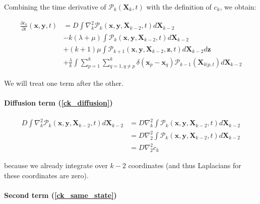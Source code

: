 Combining the time derivative of $\mathcal{P}_{k}(\boldsymbol{X}_{k},t)$ with
the definition of $c_{k}$, we obtain:

\begin{subequations} 
\begin{align}
\frac{\partial c_{k}}{\partial t}(\boldsymbol{x},\boldsymbol{y},t) & =D\int\nabla_{k}^{2}\mathcal{P}_{k}(\boldsymbol{x},\boldsymbol{y},\boldsymbol{X}_{k-2},t)d\boldsymbol{X}_{k-2}\label{ck_diffusion}\\
 & -k(\lambda+\mu)\int\mathcal{P}_{k}(\boldsymbol{x},\boldsymbol{y},\boldsymbol{X}_{k-2},t)d\boldsymbol{X}_{k-2}\label{ck_same_state}\\
 & +(k+1)\mu\int\mathcal{P}_{k+1}(\boldsymbol{x},\boldsymbol{y},\boldsymbol{X}_{k-2},\boldsymbol{z},t)d\boldsymbol{X}_{k-2}d\boldsymbol{z}\label{ck_death}\\
 & +\frac{\lambda}{k}\int\sum_{p=1}^{k}\sum_{q=1,q\neq p}^{k}\delta({\boldsymbol{x}_p-\boldsymbol{x}_q})\mathcal{P}_{k-1}(\boldsymbol{X}_{k|p,t})d\boldsymbol{X}_{k-2}\label{ck_birth}
\end{align}
\end{subequations}

We will treat one term after the other. \\


\paragraph*{Diffusion term (\ref{ck_diffusion})}

\begin{subequations} 
\begin{align}
D\int\nabla_{k}^{2}\mathcal{P}_{k}(\boldsymbol{x},\boldsymbol{y},\boldsymbol{X}_{k-2},t)d\boldsymbol{X}_{k-2} & =D\nabla_{k}^{2}\int\mathcal{P}_{k}(\boldsymbol{x},\boldsymbol{y},\boldsymbol{X}_{k-2},t)d\boldsymbol{X}_{k-2}\\
 & =D\nabla_{2}^{2}\int\mathcal{P}_{k}(\boldsymbol{x},\boldsymbol{y},\boldsymbol{X}_{k-2},t)d\boldsymbol{X}_{k-2}\\
 & =D\nabla_{2}^{2}c_{k}\label{diffusion_term_deriv}
\end{align}
\end{subequations}

because we already integrate over $k-2$ coordinates (and thus Laplacians for these coordinates are zero).

\paragraph*{Second term (\ref{ck_same_state})}


